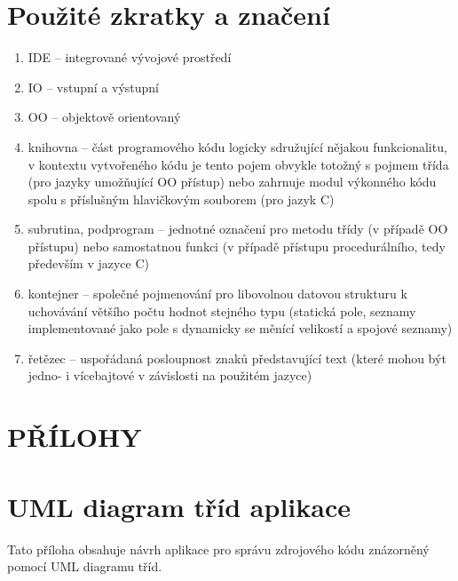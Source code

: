 \documentclass[onepage, a4paper, 12pt]{bakalarka}
\begin{document}
\chapter*{Použité zkratky a značení}
\begin{enumerate}
\item{IDE -- integrované vývojové prostředí}
\item{IO -- vstupní a výstupní}
\item{OO -- objektově orientovaný}
\item{knihovna -- část programového kódu logicky sdružující nějakou funkcionalitu, v kontextu vytvořeného kódu je tento pojem obvykle totožný s pojmem třída (pro jazyky umožňující OO přístup) nebo zahrnuje modul výkonného kódu spolu s příslušným hlavičkovým souborem (pro jazyk C)}
\item{subrutina, podprogram -- jednotné označení pro metodu třídy (v případě OO přístupu) nebo samostatnou funkci (v případě přístupu procedurálního, tedy především v jazyce C)}
\item{kontejner -- společné pojmenování pro libovolnou datovou strukturu k uchovávání většího počtu hodnot stejného typu (statická pole, seznamy implementované jako pole s dynamicky se měnící velikostí a spojové seznamy)}
\item{řetězec -- uspořádaná posloupnost znaků představující text (které mohou být jedno- i vícebajtové v závislosti na použitém jazyce)}
\end{enumerate}
\chapter*{PŘÍLOHY}
\chapter{UML diagram tříd aplikace}\label{sec:uml-diagram}
Tato příloha obsahuje návrh aplikace pro správu zdrojového kódu znázorněný pomocí UML diagramu tříd.
\end{document}
